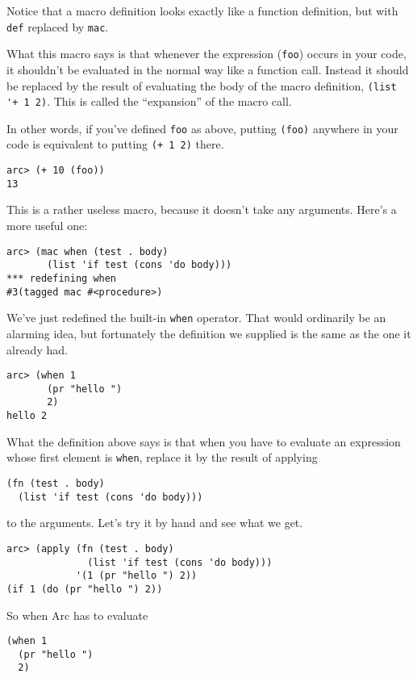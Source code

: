 \documentclass[a4paper,12pt]{book}
\begin{document}
Notice that a macro definition looks exactly like a function
definition, but with \verb|def| replaced by \verb|mac|.  

What this macro says is that whenever the expression (\verb|foo|) occurs
in your code, it shouldn't be evaluated in the normal way like a
function call.  Instead it should be replaced by the result of
evaluating the body of the macro definition, \verb|(list '+ 1 2)|.
This is called the ``expansion'' of the macro call.

In other words, if you've defined \verb|foo| as above, putting \verb|(foo)|
anywhere in your code is equivalent to putting \verb|(+ 1 2)| there.

\begin{verbatim}
arc> (+ 10 (foo))
13
\end{verbatim}

This is a rather useless macro, because it doesn't take any arguments.
Here's a more useful one:

\begin{verbatim}
arc> (mac when (test . body)
       (list 'if test (cons 'do body)))
*** redefining when
#3(tagged mac #<procedure>)
\end{verbatim}

We've just redefined the built-in \verb|when| operator.  That would
ordinarily be an alarming idea, but fortunately the definition we
supplied is the same as the one it already had.

\begin{verbatim}
arc> (when 1 
       (pr "hello ")
       2)
hello 2
\end{verbatim}

What the definition above says is that when you have to evaluate
an expression whose first element is \verb|when|, replace it by the result
of applying

\begin{verbatim}
(fn (test . body) 
  (list 'if test (cons 'do body)))
\end{verbatim}

to the arguments.  Let's try it by hand and see what we get.

\begin{verbatim}
arc> (apply (fn (test . body) 
              (list 'if test (cons 'do body)))
            '(1 (pr "hello ") 2))
(if 1 (do (pr "hello ") 2))
\end{verbatim}

So when {\sc{}Arc} has to evaluate 

\begin{verbatim}
(when 1 
  (pr "hello ") 
  2) 
\end{verbatim}
\end{document}
